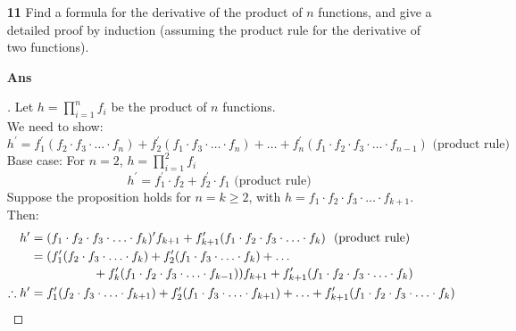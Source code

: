 \documentclass[paper=usletter, fontsize=12pt]{article}
\begin{document}
\begin{itemize}
\begin{itemize}
            \item[\textbf{11}] Find a formula for the derivative of the product
            of $n$ functions, and give a detailed proof by induction (assuming
            the product rule for the derivative of two functions).
            \item[\textbf{Ans}]
            \begin{proof}[\unskip\nopunct]
                Let $h = \prod_{i=1}^{n} f_i$ be the product of $n$ functions.
                \\ We need to show:
                \begin{equation*}
                    h^\prime = f_1^\prime(f_2 \cdot f_3 \cdot \ldots \cdot f_n)
                    + f_2^\prime(f_1 \cdot f_3 \cdot \ldots \cdot f_n) + \ldots
                    + f_n^\prime(f_1 \cdot f_2 \cdot f_3 \cdot \ldots \cdot
                      f_{n-1}) \text{ \ (product rule) \ }
                \end{equation*}
                Base case: For $n = 2$, $h = \prod_{i=1}^{2} f_i$
                \begin{equation*}
                    h^\prime = f_1^\prime \cdot f_2 + f_2^\prime \cdot f_1
                    \text{ \ (product rule) \ }
                \end{equation*}
                Suppose the proposition holds for $n = k \ge 2$, with $h = f_1
                \cdot f_2 \cdot f_3 \cdot \ldots \cdot f_{k+1}$. Then:
                \begin{align*}
                    h^\prime & = (f_1 \cdot f_2 \cdot f_3 \cdot \ldots \cdot
                    f_{k})^\prime f_{k+1} + f_{k+1}^\prime(f_1 \cdot f_2 \cdot
                    f_3 \cdot \ldots \cdot f_{k}) \text{ \ (product rule) \ }
                    \\
                    & = \!\begin{multlined}[t][10.5cm]
                        (f_1^\prime(f_2 \cdot f_3 \cdot \ldots \cdot f_k) +
                        f_2^\prime(f_1 \cdot f_3 \cdot \ldots \cdot f_k) +
                        \ldots \\ + f_k^\prime(f_1 \cdot f_2 \cdot f_3 \cdot
                        \ldots \cdot f_{k-1})) f_{k+1} + f_{k+1}^\prime(f_1
                        \cdot f_2 \cdot f_3 \cdot \ldots \cdot f_{k})
                    \end{multlined} \\
                    \therefore h^\prime & = f_1^\prime(f_2 \cdot f_3 \cdot
                    \ldots \cdot f_{k+1}) + f_2^\prime(f_1 \cdot f_3 \cdot
                      \ldots \cdot f_{k+1}) + \ldots + f_{k+1}^\prime(f_1 \cdot
                      f_2 \cdot f_3 \cdot \ldots \cdot f_{k}) \qedhere
                \end{align*}
            \end{proof}
            \vspace{0.2in}


\end{itemize}
\end{itemize}
\end{document}
